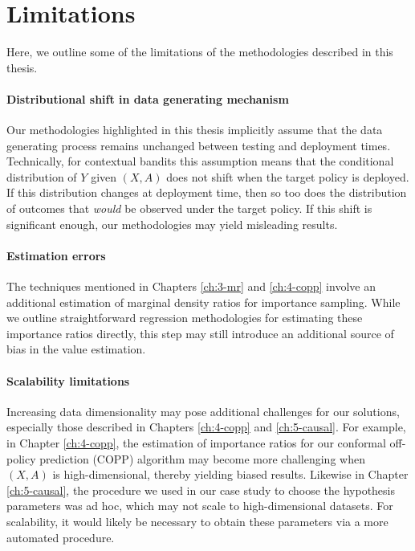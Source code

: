 \section{Limitations}
Here, we outline some of the limitations of the methodologies described in this thesis. 

\paragraph*{Distributional shift in data generating mechanism}
Our methodologies highlighted in this thesis implicitly assume that the data generating process remains unchanged between testing and deployment times. 
Technically, for contextual bandits this assumption means that the conditional distribution of $Y$ given $(X, A)$ does not shift when the target policy is deployed. 
If this distribution changes at deployment time, then so too does the distribution of outcomes that \emph{would} be observed under the target policy. 
If this shift is significant enough, our methodologies may yield misleading results.  

\paragraph*{Estimation errors}
The techniques mentioned in Chapters \ref*{ch:3-mr} and \ref*{ch:4-copp} involve an additional estimation of marginal density ratios for importance sampling. 
While we outline straightforward regression methodologies for estimating these importance ratios directly, this step may still introduce an additional source of bias in the value estimation. 

\paragraph*{Scalability limitations}
Increasing data dimensionality may pose additional challenges for our solutions, especially those described in Chapters \ref*{ch:4-copp} and \ref*{ch:5-causal}. 
For example, in Chapter \ref*{ch:4-copp}, the estimation of importance ratios for our conformal off-policy prediction (COPP) algorithm may become more challenging when $(X, A)$ is high-dimensional, thereby yielding biased results.
Likewise in Chapter \ref*{ch:5-causal}, the procedure we used in our case study to choose the hypothesis parameters was ad hoc, which may not scale to high-dimensional datasets.
For scalability, it would likely be necessary to obtain these parameters via a more automated procedure.

